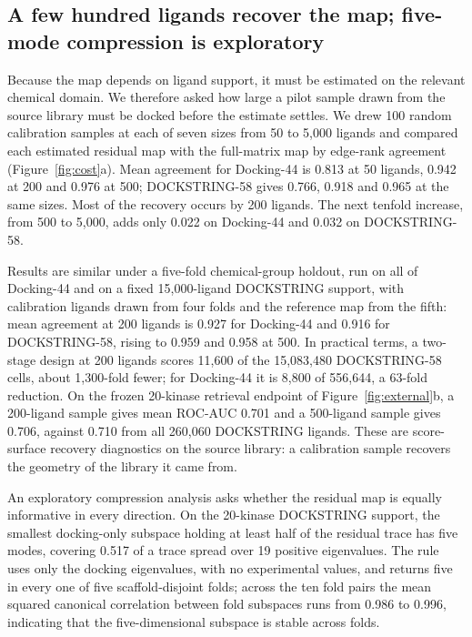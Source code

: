 \subsection{A few hundred ligands recover the map; five-mode compression is exploratory}
\label{sec:cost}

Because the map depends on ligand support, it must be estimated on the
relevant chemical domain. We therefore asked how large a pilot sample drawn from the source library
must be docked before the estimate settles. We drew 100 random calibration
samples at each of seven sizes from 50 to 5,000 ligands and compared each
estimated residual map with the full-matrix map by edge-rank agreement
(Figure~\ref{fig:cost}a). Mean agreement for Docking-44 is 0.813 at 50 ligands,
0.942 at 200 and 0.976 at 500; DOCKSTRING-58 gives 0.766, 0.918 and 0.965 at the
same sizes. Most of the recovery occurs by 200 ligands. The next tenfold increase, from 500
to 5,000, adds only 0.022 on Docking-44 and 0.032 on DOCKSTRING-58.

Results are similar under a five-fold chemical-group holdout, run on all of Docking-44 and
on a fixed 15{,}000-ligand DOCKSTRING support, with calibration ligands drawn from
four folds and the reference map from the fifth: mean agreement at 200 ligands is
0.927 for Docking-44 and 0.916 for DOCKSTRING-58, rising to 0.959 and 0.958 at
500. In practical terms, a two-stage design at 200 ligands scores 11,600 of the
15,083,480 DOCKSTRING-58 cells, about 1,300-fold fewer; for Docking-44 it is 8,800
of 556,644, a 63-fold reduction. On the frozen 20-kinase retrieval endpoint of
Figure~\ref{fig:external}b, a 200-ligand sample gives mean ROC-AUC 0.701 and a
500-ligand sample gives 0.706, against 0.710 from all 260{,}060 DOCKSTRING ligands. These are
score-surface recovery diagnostics on the source library: a calibration sample recovers the
geometry of the library it came from.

An exploratory compression analysis asks whether the residual map is equally informative in every direction. On the 20-kinase
DOCKSTRING support, the smallest docking-only subspace holding at least half of the
residual trace has five modes, covering 0.517 of a trace spread over 19 positive
eigenvalues. The rule uses only the docking eigenvalues, with no experimental
values, and returns five in every one of five scaffold-disjoint folds;
across the ten fold pairs the mean squared canonical correlation between fold
subspaces runs from 0.986 to 0.996, indicating that the five-dimensional subspace
is stable across folds.

